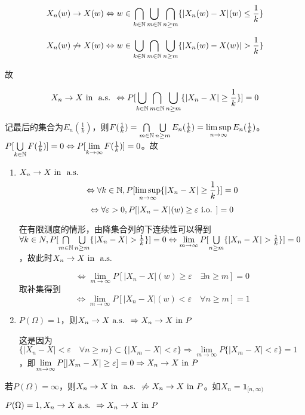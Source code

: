 \documentclass{ctexart}
\begin{document}
\[X_{n}(w)\to X(w)\Leftrightarrow w\in\bigcap_{k\in \mathbb{N}}\bigcup_{m\in\mathbb{N}}\bigcap_{n\geq m}\{|X_{n}(w)-X|(w)\leq\frac{1}{k}\}\]

\[X_{n}(w)\not\to X(w)\Leftrightarrow w\in\bigcup_{k\in \N}\bigcap_{m\in\N}\bigcup_{n\geq m}\{|X_{n}(w)-X(w)|>\frac{1}{k}\}\]

故

\[X_{n}\to X\text{ in } \text{ a.s. }\Leftrightarrow P[\bigcup_{k\in\mathbb{N}}\bigcap_{m\in\mathbb{N}}\bigcup_{n\geq m}\{|X_{n}-X|\geq\frac{1}{k}\}]=0\]

记最后的集合为$E_{n}(\frac 1 k)$，则$F(\frac 1 k)=\bigcap\limits_{m\in\mathbb{N}}\bigcup\limits_{n\geq m}E_{n}(\frac 1 k)=\limsup\limits_{n\to\infty}E_{n}(\frac 1 k)$。$P[\bigcup\limits_{k\in\mathbb{N}}F(\frac 1 k)]=0\Leftrightarrow P[\lim\limits_{k\to\infty}F(\frac 1 k)]=0$。故

\begin{Prop}
  \begin{enumerate}
  \item $X_{n}\to X\text{ in } \text{ a.s. }$
    \[\Leftrightarrow \forall k\in\mathbb{N}, P[\limsup\limits_{n\to\infty}\{|X_{n}-X|\geq\frac{1}{k}\}]=0\]
    \[\Leftrightarrow \forall\varepsilon>0, P[|X_{n}-X|(w)\geq\varepsilon \text{ i.o. }]=0\]

    在有限测度的情形，由降集合列的下连续性可以得到$\forall k\in N, P[\bigcap\limits_{m\in\N}\bigcup\limits_{n\geq m}\{|X_{n}-X|>\frac 1 k\}]=0\Leftrightarrow \lim\limits_{m\to\infty}P[\bigcup\limits_{n\geq m}\{|X_{n}-X|>\frac 1 k\}]=0$，故此时$X_{n}\to X\text{ in }\text{ a.s. }$

\[\Leftrightarrow \lim_{m\to\infty}P[|X_{n}-X|(w)\geq \varepsilon\quad \exists n\geq m]=0\]
取补集得到
\[\Leftrightarrow \lim_{m\to\infty}P[|X_{n}-X|(w)<\varepsilon\quad\forall n\geq m]=1\]

\item $P(\Omega)=1$，则$X_{n}\to X\text{ a.s. }\Rightarrow X_{n}\to X\text{ in } P$

  这是因为$\{|X_{n}-X|<\varepsilon\quad\forall n\geq m\}\subset \{|X_{m}-X|<\varepsilon\}\Rightarrow \lim\limits_{m\to\infty}P\{|X_{m}-X|<\varepsilon\}=1$，即$\lim\limits_{m\to\infty}P[|X_{m}-X|\geq \varepsilon]=0\Rightarrow X_{n}\to X\text{ in } P$
  \end{enumerate}
\end{Prop}  
  \begin{Rmk}
    若$P(\Omega)=\infty$，则$X_{n}\to X\text{ in } \text{ a.s. }\not\Rightarrow X_{n}\to X\text{ in } P$。如$X_{n}=\bm 1_{[n,\infty)}$
  \end{Rmk}

  \begin{Rmk}
    $P(\Omega)=1, X_{n}\to X\text{ a.s. }\Rightarrow X_{n}\to X\text{ in } P$
  \end{Rmk}
\end{document}
